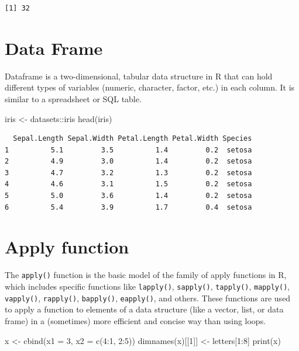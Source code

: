 \documentclass[
  letterpaper,
  DIV=11,
  numbers=noendperiod]{scrreprt}
\newenvironment{Shaded}{\begin{snugshade}}{\end{snugshade}}
\newcommand{\AttributeTok}[1]{\textcolor[rgb]{0.40,0.45,0.13}{#1}}
\newcommand{\DecValTok}[1]{\textcolor[rgb]{0.68,0.00,0.00}{#1}}
\newcommand{\FunctionTok}[1]{\textcolor[rgb]{0.28,0.35,0.67}{#1}}
\newcommand{\NormalTok}[1]{\textcolor[rgb]{0.00,0.23,0.31}{#1}}
\newcommand{\OtherTok}[1]{\textcolor[rgb]{0.00,0.23,0.31}{#1}}
\newcommand{\SpecialCharTok}[1]{\textcolor[rgb]{0.37,0.37,0.37}{#1}}
\begin{document}
\begin{verbatim}
[1] 32
\end{verbatim}

\section{Data Frame}\label{data-frame}

Dataframe is a two-dimensional, tabular data structure in R that can
hold different types of variables (numeric, character, factor, etc.) in
each column. It is similar to a spreadsheet or SQL table.

\begin{Shaded}
\begin{Highlighting}[]
\NormalTok{iris }\OtherTok{\textless{}{-}}\NormalTok{ datasets}\SpecialCharTok{::}\NormalTok{iris}
\FunctionTok{head}\NormalTok{(iris)}
\end{Highlighting}
\end{Shaded}

\begin{verbatim}
  Sepal.Length Sepal.Width Petal.Length Petal.Width Species
1          5.1         3.5          1.4         0.2  setosa
2          4.9         3.0          1.4         0.2  setosa
3          4.7         3.2          1.3         0.2  setosa
4          4.6         3.1          1.5         0.2  setosa
5          5.0         3.6          1.4         0.2  setosa
6          5.4         3.9          1.7         0.4  setosa
\end{verbatim}

\section{Apply function}\label{apply-function}

The \texttt{apply()} function is the basic model of the family of apply
functions in R, which includes specific functions like
\texttt{lapply()}, \texttt{sapply()}, \texttt{tapply()},
\texttt{mapply()}, \texttt{vapply()}, \texttt{rapply()},
\texttt{bapply()}, \texttt{eapply()}, and others. These functions are
used to apply a function to elements of a data structure (like a vector,
list, or data frame) in a (sometimes) more efficient and concise way
than using loops.

\begin{Shaded}
\begin{Highlighting}[]
\NormalTok{x }\OtherTok{\textless{}{-}} \FunctionTok{cbind}\NormalTok{(}\AttributeTok{x1 =} \DecValTok{3}\NormalTok{, }\AttributeTok{x2 =} \FunctionTok{c}\NormalTok{(}\DecValTok{4}\SpecialCharTok{:}\DecValTok{1}\NormalTok{, }\DecValTok{2}\SpecialCharTok{:}\DecValTok{5}\NormalTok{))}
\FunctionTok{dimnames}\NormalTok{(x)[[}\DecValTok{1}\NormalTok{]] }\OtherTok{\textless{}{-}}\NormalTok{ letters[}\DecValTok{1}\SpecialCharTok{:}\DecValTok{8}\NormalTok{]}
\FunctionTok{print}\NormalTok{(x)}
\end{Highlighting}
\end{Shaded}
\end{document}
